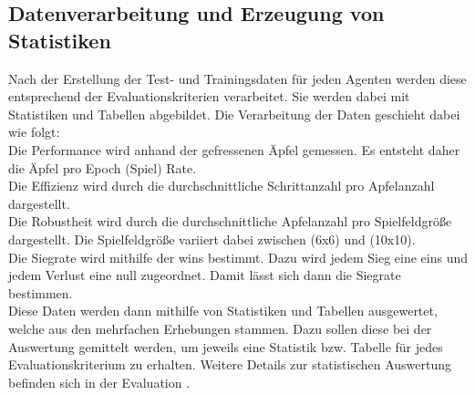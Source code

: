 \subsection{Datenverarbeitung und Erzeugung von Statistiken} \label{subsec:Konzept_Datenverarbeitung}
Nach der Erstellung der Test- und Trainingsdaten für jeden Agenten werden diese entsprechend der Evaluationskriterien  verarbeitet. Sie werden dabei mit Statistiken und Tabellen abgebildet.
Die Verarbeitung der Daten geschieht dabei wie folgt:\\
Die Performance wird anhand der gefressenen Äpfel gemessen. Es entsteht daher die Äpfel pro Epoch (Spiel) Rate.\\
Die Effizienz wird durch die durchschnittliche Schrittanzahl pro Apfelanzahl dargestellt.\\
Die Robustheit wird durch die durchschnittliche Apfelanzahl pro Spielfeldgröße dargestellt.
Die Spielfeldgröße variiert dabei zwischen (6x6) und (10x10).\\
Die Siegrate wird mithilfe der wins bestimmt. Dazu wird jedem Sieg eine eins und jedem Verlust eine null zugeordnet. Damit lässt sich dann die Siegrate bestimmen.\\
Diese Daten werden dann mithilfe von Statistiken und Tabellen ausgewertet, welche aus den mehrfachen Erhebungen stammen. Dazu sollen diese bei der Auswertung gemittelt werden, um jeweils eine Statistik bzw. Tabelle für jedes Evaluationskriterium zu erhalten. 
Weitere Details zur statistischen Auswertung befinden sich in der Evaluation .
